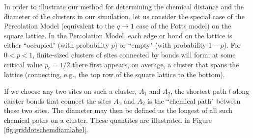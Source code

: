 \documentclass[aps, preprint, groupedaddress]{revtex4-1}
\begin{document}









In order to illustrate our method for determining the chemical distance and the diameter of the clusters in our simulation, let us consider the special case of the Percolation Model (equivalent to the $q \to 1$ case of the Potts model) on the square lattice.  In the Percolation Model, each edge or bond on the lattice is either ``occupied" (with probability $p$) or ``empty" (with probability $1-p$). For $0 < p < 1$, finite-sized clusters of sites connected by bonds will form; at some critical value $p_c = 1/2$ there first appears, on average, a cluster that spans the lattice \cite{Stau96} (connecting, e.g., the top row of the square lattice to the bottom). 

If we choose any two sites on such a cluster, $A_1$ and $A_2$, the shortest path $l$ along cluster bonds that connect the sites $A_1$ and $A_2$ is the ``chemical path" \cite{HrHoSt84} between these two sites. The diameter may then be defined as the longest of all such chemical paths on a cluster. These quantites are illustrated in Figure \ref{fig:griddotschemdiamlabel}.
\end{document}
